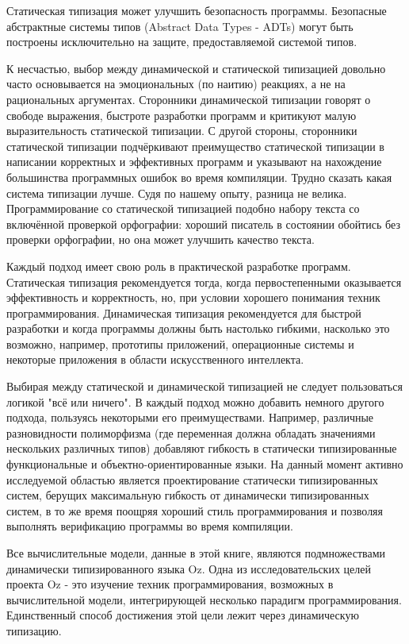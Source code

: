 Статическая типизация может улучшить безопасность программы. Безопасные абстрактные системы типов (Abstract Data Types - ADTs) могут быть построены исключительно на защите, предоставляемой системой типов.

К несчастью, выбор между динамической и статической типизацией довольно часто основывается на эмоциональных (по наитию) реакциях, а не на рациональных аргументах. Сторонники динамической типизации говорят о свободе выражения, быстроте разработки программ и критикуют малую выразительность статической типизации. С другой стороны, сторонники статической типизации подчёркивают преимущество статической типизации в написании корректных и эффективных программ и указывают на нахождение большинства программных ошибок во время компиляции. Трудно сказать какая система типизации лучше. Судя по нашему опыту, разница не велика. Программирование со статической типизацией подобно набору текста со включённой проверкой орфографии: хороший писатель в состоянии обойтись без проверки орфографии, но она может улучшить качество текста.

Каждый подход имеет свою роль в практической разработке программ. Статическая типизация рекомендуется тогда, когда первостепенными оказывается эффективность и корректность, но, при условии хорошего понимания техник программирования. Динамическая типизация рекомендуется для быстрой разработки и когда программы должны быть настолько гибкими, насколько это возможно, например, прототипы приложений, операционные системы и некоторые приложения в области искусственного интеллекта.

Выбирая между статической и динамической типизацией не следует пользоваться логикой "всё или ничего". В каждый подход можно добавить немного другого подхода, пользуясь некоторыми его преимуществами. Например, различные разновидности полиморфизма (где переменная должна обладать значениями нескольких различных типов) добавляют гибкость в статически типизированные функциональные и объектно-ориентированные языки. На данный момент активно исследуемой областью является проектирование статически типизированных систем, берущих максимальную гибкость от динамически типизированных систем, в то же время поощряя хороший стиль программирования и позволяя выполнять верификацию программы во время компиляции.

Все вычислительные модели, данные в этой книге, являются подмножествами динамически типизированного языка Oz. Одна из исследовательских целей проекта Oz - это изучение техник программирования, возможных в вычислительной модели, интегрирующей несколько парадигм программирования. Единственный способ достижения этой цели лежит через динамическую типизацию.

